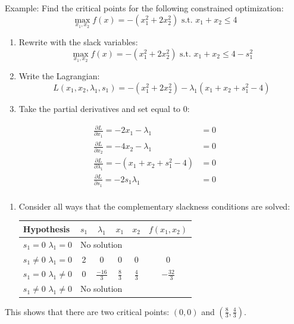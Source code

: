 \documentclass[]{book}
\providecommand{\tightlist}{%
  \setlength{\itemsep}{0pt}\setlength{\parskip}{0pt}}
\theoremstyle{definition}
\theoremstyle{definition}
\theoremstyle{definition}
\theoremstyle{remark}
\begin{document}
Example: Find the critical points for the following constrained
optimization:
\[\max_{x_1,x_2} f(x) = -(x_1^2 + 2x_2^2) \text{ s.t. } x_1 + x_2 \le 4\]

\begin{enumerate}
\def\labelenumi{\arabic{enumi}.}
\item
  Rewrite with the slack variables:
  \[\max_{x_1,x_2} f(x) = -(x_1^2 + 2x_2^2) \text{ s.t. } x_1 + x_2 \le 4 - s_1^2\]
\item
  Write the Lagrangian:
  \[L(x_1,x_2,\lambda_1,s_1) = -(x_1^2 + 2x_2^2) - \lambda_1 (x_1 + x_2 + s_1^2 - 4)\]
\item
  Take the partial derivatives and set equal to 0:
\end{enumerate}

\begin{align*}
\frac{\partial L}{\partial x_1} = -2x_1 - \lambda_1  &= 0\\
\frac{\partial L}{\partial x_2}  = -4x_2 - \lambda_1 &=  0\\
\frac{\partial L}{\partial \lambda_1} = -(x_1 + x_2 + s_1^2 - 4)&= 0\\
\frac{\partial L}{\partial s_1} = -2s_1\lambda_1 &= 0\\
\end{align*}

\begin{enumerate}
\def\labelenumi{\arabic{enumi}.}
\setcounter{enumi}{3}
\tightlist
\item
  Consider all ways that the complementary slackness conditions are
  solved:

  \begin{center}
  \begin{tabular}{|l|cccc|c|}
  \hline
  Hypothesis & $s_1$ & $\lambda_1$ & $x_1$ & $x_2$ & $f(x_1, x_2)$\\
  \hline
  $s_1 = 0$ $\lambda_1 = 0$ & \multicolumn{4}{l|}{No solution} & \\
  $s_1 \neq 0$ $\lambda_1 = 0$ & 2 & 0 & 0 & 0  & 0\\
  $s_1 = 0$ $\lambda_1 \neq 0$ & 0 & $\frac{-16}{3}$ & $\frac{8}{3}$ & $\frac{4}{3}$ & $-\frac{32}{3}$\\
  $s_1 \neq 0$ $\lambda_1 \neq 0$ & \multicolumn{4}{l|}{No solution} &\\
  \hline
  \end{tabular}
  \end{center}
\end{enumerate}

This shows that there are two critical points: \((0,0)\) and
\((\frac{8}{3},\frac{4}{3})\).
\end{document}

